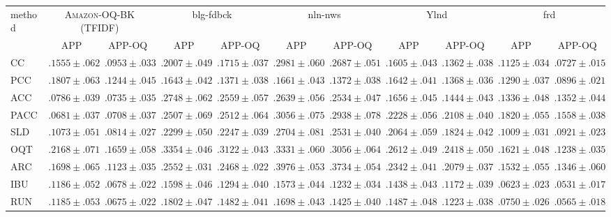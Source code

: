 \begin{tabular}{lcccccccccc}
  \toprule
  \multirow{2}{*}{method} & \multicolumn{2}{c}{\textsc{Amazon-OQ-BK} (TFIDF)} & \multicolumn{2}{c}{blg-fdbck} & \multicolumn{2}{c}{nln-nws} & \multicolumn{2}{c}{Ylnd} & \multicolumn{2}{c}{frd} \\
  & APP & APP-OQ & APP & APP-OQ & APP & APP-OQ & APP & APP-OQ & APP & APP-OQ \\
  \midrule
  CC & ${.1555 \pm .062}$ & ${.0953 \pm .033}$ & ${.2007 \pm .049}$ & ${.1715 \pm .037}$ & ${.2981 \pm .060}$ & ${.2687 \pm .051}$ & ${.1605 \pm .043}$ & ${.1362 \pm .038}$ & ${.1125 \pm .034}$ & ${.0727 \pm .015}$ \\
  PCC & ${.1807 \pm .063}$ & ${.1244 \pm .045}$ & ${.1643 \pm .042}$ & ${.1371 \pm .038}$ & ${.1661 \pm .043}$ & ${.1372 \pm .038}$ & ${.1642 \pm .041}$ & ${.1368 \pm .036}$ & ${.1290 \pm .037}$ & ${.0896 \pm .021}$ \\
  ACC & ${.0786 \pm .039}$ & ${.0735 \pm .035}$ & ${.2748 \pm .062}$ & ${.2559 \pm .057}$ & ${.2639 \pm .056}$ & ${.2534 \pm .047}$ & ${.1656 \pm .045}$ & ${.1444 \pm .043}$ & ${.1336 \pm .048}$ & ${.1352 \pm .044}$ \\
  PACC & ${.0681 \pm .037}$ & ${.0708 \pm .037}$ & ${.2507 \pm .069}$ & ${.2512 \pm .064}$ & ${.3056 \pm .075}$ & ${.2938 \pm .078}$ & ${.2228 \pm .056}$ & ${.2108 \pm .040}$ & ${.1820 \pm .055}$ & ${.1558 \pm .038}$ \\
  SLD & ${.1073 \pm .051}$ & ${.0814 \pm .027}$ & ${.2299 \pm .050}$ & ${.2247 \pm .039}$ & ${.2704 \pm .081}$ & ${.2531 \pm .040}$ & ${.2064 \pm .059}$ & ${.1824 \pm .042}$ & ${.1009 \pm .031}$ & ${.0921 \pm .023}$ \\[.5em]
  OQT & ${.2168 \pm .071}$ & ${.1659 \pm .058}$ & ${.3354 \pm .046}$ & ${.3122 \pm .043}$ & ${.3331 \pm .060}$ & ${.3056 \pm .064}$ & ${.2612 \pm .049}$ & ${.2418 \pm .050}$ & ${.1621 \pm .048}$ & ${.1238 \pm .035}$ \\
  ARC & ${.1698 \pm .065}$ & ${.1123 \pm .035}$ & ${.2552 \pm .031}$ & ${.2468 \pm .022}$ & ${.3976 \pm .053}$ & ${.3734 \pm .054}$ & ${.2342 \pm .041}$ & ${.2079 \pm .037}$ & ${.1532 \pm .055}$ & ${.1346 \pm .060}$ \\
  IBU & ${.1186 \pm .052}$ & ${.0678 \pm .022}$ & ${.1598 \pm .046}$ & ${.1294 \pm .040}$ & ${.1573 \pm .044}$ & $\mathbf{.1232 \pm .034}$ & ${.1438 \pm .043}$ & ${.1172 \pm .039}$ & $\mathbf{.0623 \pm .023}$ & ${.0531 \pm .017}$ \\
  RUN & ${.1185 \pm .053}$ & ${.0675 \pm .022}$ & ${.1802 \pm .047}$ & ${.1482 \pm .041}$ & ${.1698 \pm .043}$ & ${.1425 \pm .040}$ & ${.1487 \pm .048}$ & ${.1223 \pm .038}$ & ${.0750 \pm .026}$ & ${.0565 \pm .018}$ \\[.5em]

\end{tabular}
